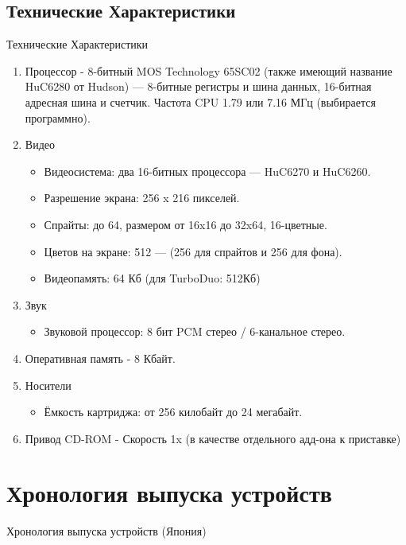 \documentclass[a4paper, 12pt]{report}
\begin{document}
\begin{landscape}

\pagecolor{black}
\color{white}
\chapter{Технические Характеристики}
Технические Характеристики
\begin{enumerate}
\item Процессор - 8-битный MOS Technology 65SC02 (также имеющий название HuC6280 от Hudson) — 8-битные регистры и шина данных, 16-битная адресная шина и счетчик. Частота CPU 1.79 или 7.16 МГц (выбирается программно).
\item Видео
\begin{itemize}
    \item Видеосистема: два 16-битных процессора — HuC6270 и HuC6260.
    \item Разрешение экрана: 256 x 216 пикселей.
    \item Спрайты: до 64, размером от 16x16 до 32x64, 16-цветные.
    \item Цветов на экране: 512 — (256 для спрайтов и 256 для фона).
    \item Видеопамять: 64 Кб (для TurboDuo: 512Кб)
\end{itemize}
\item Звук
\begin{itemize}
    \item Звуковой процессор: 8 бит PCM стерео / 6-канальное стерео.
\end{itemize}
\item Оперативная память - 8 Кбайт.
\item Носители
\begin{itemize}
    \item Ёмкость картриджа: от 256 килобайт до 24 мегабайт.
\end{itemize}
\item Привод CD-ROM - Скорость 1x (в качестве отдельного адд-она к приставке)
\end{enumerate}
\end{landscape}

\pagecolor{white}
\color{black}
\chapter{Хронология выпуска устройств}
Хронология выпуска устройств (Япония)\newline
\end{document}
